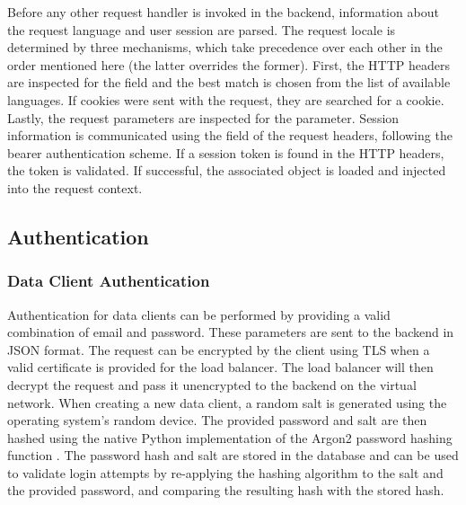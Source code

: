     Before any other request handler is invoked in the backend,
    information about the request language and user session are parsed.
    The request locale is determined by three mechanisms, which take
    precedence over each other in the order mentioned here
    (the latter overrides the former). First, the HTTP headers
    are inspected for the  field and the best
    match is chosen from the list of available languages.
    If cookies were sent with the request, they are searched for
    a  cookie. Lastly, the request parameters
    are inspected for the  parameter.
    Session information is communicated using the 
    field of the request headers, following the bearer authentication scheme.
    If a session token is found in the HTTP headers, the token is validated.
    If successful, the associated  object is loaded and
    injected into the request context.    

\subsection{Authentication}
    \subsubsection{Data Client Authentication}
        Authentication for data clients can be performed by providing
        a valid combination of email and password. These parameters
        are sent to the backend in JSON format. The request
        can be encrypted by the client using TLS when a valid
        certificate is provided for the load balancer. The load balancer
        will then decrypt the request and pass it unencrypted to the backend
        on the virtual network. When creating a new data client,
        a random salt is generated using the operating system's
        random device. The provided password and salt are then hashed
        using the native Python implementation of the Argon2 password hashing function \cite{argon2}.
        The password hash and salt are stored in
        the database and can be used to validate login attempts
        by re-applying the hashing algorithm to the salt and the provided
        password, and comparing the resulting hash with the stored hash.

